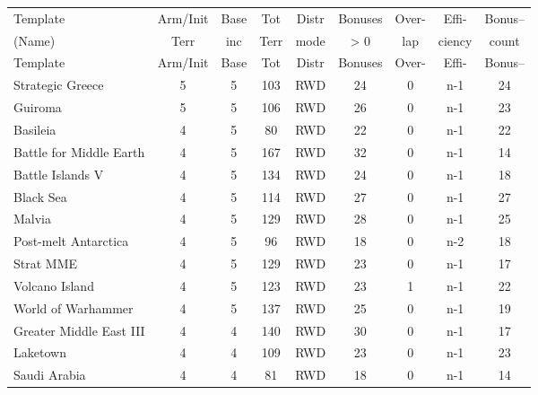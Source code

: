 \scriptsize
\begin{longtable}{|l|c|c|c|c|c|c|c|c|}
\hline
\rowcolor{Baby_Blue}
Template & Arm/\newline Init & Base & Tot & Distr & Bonuses & Over- & Effi- & Bonus– \\ 
\rowcolor{Baby_Blue}
(Name)   & Terr & inc & Terr & mode & > 0 & lap & ciency & count \\ \hline\hline
\endfirsthead
\hline
\rowcolor{Baby_Blue}
Template & Arm/\newline Init & Base & Tot & Distr & Bonuses & Over- & Effi- & Bonus– \\ \hline\hline
\endhead
Strategic Greece          & 5 & 5 & 103 & RWD & 24 & 0 & n-1 & 24 \\ \hline
Guiroma                   & 5 & 5 & 106 & RWD & 26 & 0 & n-1 & 23 \\ \hline\hline\hline
Basileia                  & 4 & 5 &  80 & RWD & 22 & 0 & n-1 & 22 \\ \hline
Battle for Middle Earth   & 4 & 5 & 167 & RWD & 32 & 0 & n-1 & 14 \\ \hline
Battle Islands V          & 4 & 5 & 134 & RWD & 24 & 0 & n-1 & 18 \\ \hline
Black Sea                 & 4 & 5 & 114 & RWD & 27 & 0 & n-1 & 27 \\ \hline
Malvia                    & 4 & 5 & 129 & RWD & 28 & 0 & n-1 & 25 \\ \hline
Post-melt Antarctica      & 4 & 5 &  96 & RWD & 18 & 0 & n-2 & 18 \\ \hline
Strat MME                 & 4 & 5 & 129 & RWD & 23 & 0 & n-1 & 17 \\ \hline
Volcano Island            & 4 & 5 & 123 & RWD & 23 & 1 & n-1 & 22 \\ \hline
World of Warhammer        & 4 & 5 & 137 & RWD & 25 & 0 & n-1 & 19 \\ \hline\hline\hline
Greater Middle East III   & 4 & 4 & 140 & RWD & 30 & 0 & n-1 & 17 \\ \hline
Laketown                  & 4 & 4 & 109 & RWD & 23 & 0 & n-1 & 23 \\ \hline
Saudi Arabia              & 4 & 4 &  81 & RWD & 18 & 0 & n-1 & 14 \\ \hline

\end{longtable}
